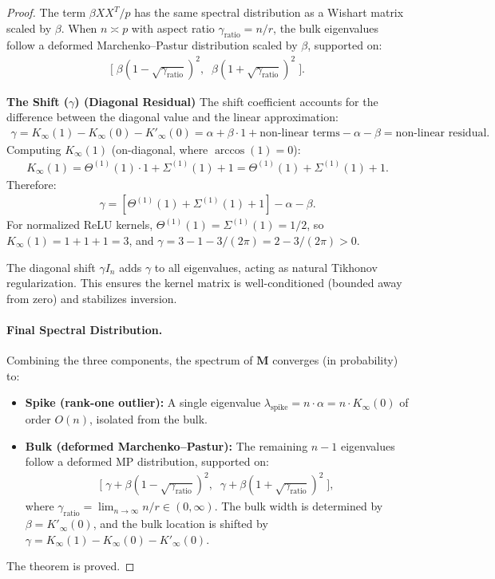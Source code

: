 \begin{proof}
The term \(\beta XX^T/p\) has the same spectral distribution as a Wishart matrix scaled by \(\beta\). When \(n \asymp p\) with aspect ratio \(\gamma_{\mathrm{ratio}} = n/r\), the bulk eigenvalues follow a deformed Marchenko–Pastur distribution scaled by \(\beta\), supported on:
\begin{align}
\Big[\;\beta(1-\sqrt{\gamma_{\mathrm{ratio}}})^2,\;\; \beta(1+\sqrt{\gamma_{\mathrm{ratio}}})^2\;\Big].
\end{align}

\textbf{The Shift (\(\gamma\))  (Diagonal Residual)}
The shift coefficient accounts for the difference between the diagonal value and the linear approximation:
\begin{align}
\gamma = K_\infty(1) - K_\infty(0) - K'_\infty(0) = \alpha + \beta \cdot 1 + \text{non-linear terms} - \alpha - \beta = \text{non-linear residual}.
\end{align}
Computing \(K_\infty(1)\) (on-diagonal, where \(\arccos(1) = 0\)):
\begin{align}
K_\infty(1) = \Theta^{(1)}(1) \cdot 1 + \Sigma^{(1)}(1) + 1 = \Theta^{(1)}(1) + \Sigma^{(1)}(1) + 1.
\end{align}
Therefore:
\begin{align}
\gamma = \left[\Theta^{(1)}(1) + \Sigma^{(1)}(1) + 1\right] - \alpha - \beta.
\end{align}
For normalized ReLU kernels, \(\Theta^{(1)}(1) = \Sigma^{(1)}(1) = 1/2\), so \(K_\infty(1) = 1 + 1 + 1 = 3\), and \(\gamma = 3 - 1 - 3/(2\pi) = 2 - 3/(2\pi) > 0\).

The diagonal shift \(\gamma I_n\) adds \(\gamma\) to all eigenvalues, acting as natural Tikhonov regularization. This ensures the kernel matrix is well-conditioned (bounded away from zero) and stabilizes inversion.

\paragraph{Final Spectral Distribution.}
Combining the three components, the spectrum of \(\mathbf{M}\) converges (in probability) to:
\begin{itemize}
\item \textbf{Spike (rank-one outlier):} A single eigenvalue \(\lambda_{\mathrm{spike}} = n \cdot \alpha = n \cdot K_\infty(0)\) of order \(O(n)\), isolated from the bulk.
\item \textbf{Bulk (deformed Marchenko–Pastur):} The remaining \(n-1\) eigenvalues follow a deformed MP distribution, supported on:
\begin{align}
\Big[\;\gamma + \beta(1-\sqrt{\gamma_{\mathrm{ratio}}})^2,\;\; \gamma + \beta(1+\sqrt{\gamma_{\mathrm{ratio}}})^2\;\Big],
\end{align}
where \(\gamma_{\mathrm{ratio}} = \lim_{n\to\infty} n/r \in (0,\infty)\). The bulk width is determined by \(\beta = K'_\infty(0)\), and the bulk location is shifted by \(\gamma = K_\infty(1) - K_\infty(0) - K'_\infty(0)\).
\end{itemize}

The theorem is proved.
\end{proof}

